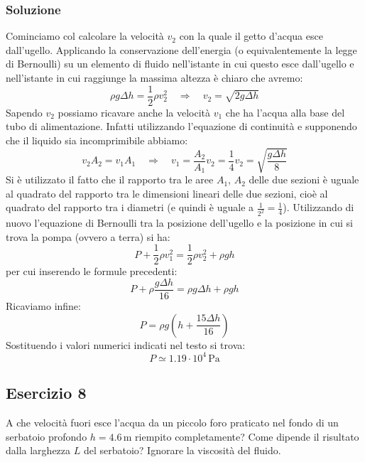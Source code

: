 \documentclass[12pt,a4paper]{book}
\begin{document}
\subsubsection*{Soluzione}
Cominciamo col calcolare la velocità $v_2$ con la quale il getto d'acqua esce dall'ugello. Applicando
la conservazione dell'energia (o equivalentemente la legge di Bernoulli) su un elemento di fluido nell'istante in cui questo esce dall'ugello e nell'istante in cui raggiunge la massima altezza è chiaro che avremo:
\begin{equation*}
\rho g\Delta h= \frac{1}{2}\rho v_2^2 \quad \Rightarrow \quad v_2=\sqrt{2g\Delta h}
\end{equation*}
Sapendo $v_2$ possiamo ricavare anche la velocità $v_1$ che ha l'acqua alla base del tubo
di alimentazione. Infatti utilizzando l'equazione di continuità e supponendo che il liquido sia incomprimibile abbiamo: 
\begin{equation*}
v_2 A_2=v_1 A_1 \quad \Rightarrow \quad v_1=\frac{A_2}{A_1} v_2= \frac{1}{4}v_2=\sqrt{\frac{g\Delta h}{8}}
\end{equation*}
Si è utilizzato il fatto che il rapporto tra le aree $A_1$, $A_2$ delle due sezioni è uguale al quadrato
del rapporto tra le dimensioni lineari delle due sezioni, cioè al quadrato del rapporto tra i diametri (e quindi è uguale a $\frac{1}{2^2}=\frac{1}{4}$). Utilizzando di nuovo l'equazione di Bernoulli 
tra la posizione dell'ugello e la posizione in cui si trova la pompa (ovvero a terra) si ha:
\begin{equation*}
P+\frac{1}{2}\rho v_1^2 = \frac{1}{2}\rho v_2^2 + \rho gh
\end{equation*}
per cui inserendo le formule precedenti:
\begin{equation*}
P+\rho \frac{g\Delta h}{16} = \rho g\Delta h + \rho gh
\end{equation*}
Ricaviamo infine:
\begin{equation*}
P= \rho g(h +\frac{15\Delta h}{16})
\end{equation*}
Sostituendo i valori numerici indicati nel testo si trova:
\begin{equation*}
P \simeq 1.19 \cdot 10^4 \, \text{Pa}
\end{equation*}

\subsection*{Esercizio 8}
A che velocità fuori esce l'acqua da un piccolo foro praticato nel fondo di un serbatoio  profondo $h=4.6 \,$m riempito completamente? Come dipende il risultato dalla larghezza $L$ del serbatoio?
Ignorare la viscosità del fluido.
\end{document}
